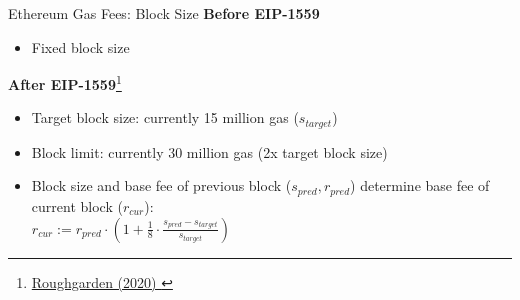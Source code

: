 \documentclass[handout]{beamer}
\begin{document}
\begin{frame}{Ethereum Gas Fees: Block Size}
	\textbf{Before EIP-1559}
	\begin{itemize}
		\item Fixed block size
	\end{itemize}
	\vspace{0.2cm}
	\textbf{After EIP-1559}\footnote{\href{https://timroughgarden.org/papers/eip1559.pdf}{Roughgarden (2020) \link}}
	\begin{itemize}
		\item Target block size: currently 15 million gas ($s_{target}$)
		\item Block limit: currently 30 million gas (2x target block size)
		\item Block size and base fee of previous block ($s_{pred}, r_{pred}$) determine base fee of current block ($r_{cur}$):\\
		\vspace{0.1cm}
		$r_{cur} := r_{pred}\cdot\left(1+\frac{1}{8}\cdot\frac{s_{pred}-s_{target}}{s_{target}}\right)$
	\end{itemize}
\end{frame}
\end{document}
